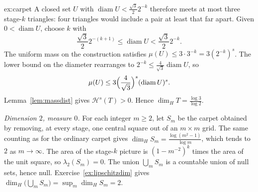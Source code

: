 \begin{solution}{ex:carpet}
A closed set $U$ with $\operatorname{diam}U<\frac{\sqrt 3}{2}2^{-k}$ therefore meets at most three stage-$k$ triangles: four triangles would include a
pair at least that far apart. Given $0<\operatorname{diam}U$, choose $k$ with
\[\frac{\sqrt 3}{2}2^{-(k+1)}\le\operatorname{diam}U<\frac{\sqrt 3}{2}2^{-k}.\]
The uniform mass on the construction satisfies $\mu(U)\le 3\cdot 3^{-k}=3(2^{-k})^s$. The lower bound on the diameter rearranges to
$2^{-k}\le\frac{4}{\sqrt 3}\operatorname{diam}U$, so
\[\mu(U)\le 3\Bigl(\frac{4}{\sqrt 3}\Bigr)^s(\operatorname{diam}U)^s.\]
Lemma~\ref{lem:massdist} gives $\mathcal H^s(T)>0$. Hence $\dim_H T=\frac{\log 3}{\log 2}$.

\emph{Dimension $2$, measure $0$.} For each integer $m\ge 2$, let $S_m$ be the carpet obtained by removing, at every stage, one central
square out of an $m\times m$ grid. The same counting as for the ordinary carpet gives
$\dim_H S_m=\frac{\log(m^2-1)}{\log m}$, which tends to $2$ as $m\to\infty$. The area of the stage-$k$ picture is $(1-m^{-2})^k$ times the
area of the unit square, so $\lambda_2(S_m)=0$. The union $\bigcup_m S_m$ is a countable union of null sets, hence null. Exercise~\ref{ex:lipschitzdim}
gives $\dim_H\bigl(\bigcup_m S_m\bigr)=\sup_m\dim_H S_m=2$.
\end{solution}

